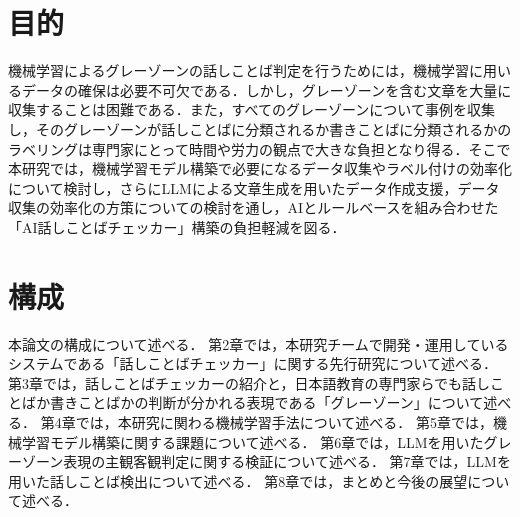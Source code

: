 \section{目的}
機械学習によるグレーゾーンの話しことば判定を行うためには，機械学習に用いるデータの確保は必要不可欠である．しかし，グレーゾーンを含む文章を大量に収集することは困難である．また，すべてのグレーゾーンについて事例を収集し，そのグレーゾーンが話しことばに分類されるか書きことばに分類されるかのラベリングは専門家にとって時間や労力の観点で大きな負担となり得る．そこで本研究では，機械学習モデル構築で必要になるデータ収集やラベル付けの効率化について検討し，さらにLLMによる文章生成を用いたデータ作成支援，データ収集の効率化の方策についての検討を通し，AIとルールベースを組み合わせた「AI話しことばチェッカー」構築の負担軽減を図る．

\section{構成}
本論文の構成について述べる．
第2章では，本研究チームで開発・運用しているシステムである「話しことばチェッカー」に関する先行研究について述べる．
第3章では，話しことばチェッカーの紹介と，日本語教育の専門家らでも話しことばか書きことばかの判断が分かれる表現である「グレーゾーン」について述べる．
第4章では，本研究に関わる機械学習手法について述べる．
第5章では，機械学習モデル構築に関する課題について述べる．
第6章では，LLMを用いたグレーゾーン表現の主観客観判定に関する検証について述べる．
第7章では，LLMを用いた話しことば検出について述べる．
第8章では，まとめと今後の展望について述べる．